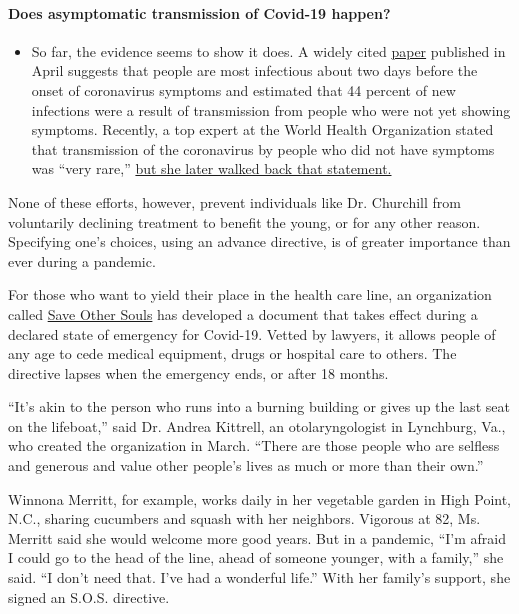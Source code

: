 \begin{itemize}
{  \paragraph{Does asymptomatic transmission of Covid-19
  happen?}\label{does-asymptomatic-transmission-of-covid-19-happen}}

  \begin{itemize}
  \tightlist
  \item
    So far, the evidence seems to show it does. A widely cited
    \href{https://www.nature.com/articles/s41591-020-0869-5}{paper}
    published in April suggests that people are most infectious about
    two days before the onset of coronavirus symptoms and estimated that
    44 percent of new infections were a result of transmission from
    people who were not yet showing symptoms. Recently, a top expert at
    the World Health Organization stated that transmission of the
    coronavirus by people who did not have symptoms was ``very rare,''
    \href{https://www.nytimes3xbfgragh.onion/2020/06/09/world/coronavirus-updates.html?action=click\&pgtype=Article\&state=default\&region=MAIN_CONTENT_3\&context=storylines_faq\#link-1f302e21}{but
    she later walked back that statement.}
  \end{itemize}
\end{itemize}

None of these efforts, however, prevent individuals like Dr. Churchill
from voluntarily declining treatment to benefit the young, or for any
other reason. Specifying one's choices, using an advance directive, is
of greater importance than ever during a pandemic.

For those who want to yield their place in the health care line, an
organization called \href{https://www.saveothersouls.org/}{Save Other
Souls} has developed a document that takes effect during a declared
state of emergency for Covid-19. Vetted by lawyers, it allows people of
any age to cede medical equipment, drugs or hospital care to others. The
directive lapses when the emergency ends, or after 18 months.

``It's akin to the person who runs into a burning building or gives up
the last seat on the lifeboat,'' said Dr. Andrea Kittrell, an
otolaryngologist in Lynchburg, Va., who created the organization in
March. ``There are those people who are selfless and generous and value
other people's lives as much or more than their own.''

Winnona Merritt, for example, works daily in her vegetable garden in
High Point, N.C., sharing cucumbers and squash with her neighbors.
Vigorous at 82, Ms. Merritt said she would welcome more good years. But
in a pandemic, ``I'm afraid I could go to the head of the line, ahead of
someone younger, with a family,'' she said. ``I don't need that. I've
had a wonderful life.'' With her family's support, she signed an S.O.S.
directive.

